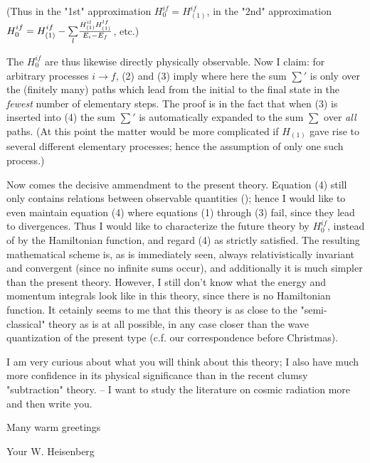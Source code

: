 (Thus in the "1st" approximation $H_0^{if}=H_{(1)}^{if}$, in the "2nd" approximation $H_0^{if} = H_{(1)}^{if} - \underset{l}{\sum}\frac{H_{(1)}^{il} H_{(1)}^{lf}}{E_i - E_f}$, etc.)

The $H_0^{if}$ are thus likewise directly physically observable. Now I claim: for arbitrary processes $i\to f$, (2) and (3) imply
where here the sum $\sum'$ is only over the (finitely many) paths which lead from the initial to the final state in the \textit{fewest} number of elementary steps. The proof is in the fact that when (3) is inserted into (4) the sum $\sum'$ is automatically expanded to the sum $\sum$ over \textit{all} paths. (At this point the matter would be more complicated if $H_{(1)}$ gave rise to several different elementary processes; hence the assumption of only one such process.)

Now comes the decisive ammendment to the present theory. Equation (4) still only contains relations between observable quantities (); hence I would like to even maintain equation (4) where equations (1) through (3) fail, since they lead to divergences. Thus I would like to characterize the future theory by $H_0^{if}$, instead of by the Hamiltonian function, and regard (4) as strictly satisfied. The resulting mathematical scheme is, as is immediately seen, always relativistically invariant and convergent (since no infinite sums occur), and additionally it is much simpler than the present theory. However, I still don't know what the energy and momentum integrals look like in this theory, since there is no Hamiltonian function. It cetainly seems to me that this theory is as close to the "semi-classical" theory as is at all possible, in any case closer than the wave quantization of the present type (c.f. our correspondence before Christmas).

I am very curious about what you will think about this theory; I also have much more confidence in its physical significance than in the recent clumsy "subtraction" theory. -- I want to study the literature on cosmic radiation more and then write you.

Many warm greetings

Your W. Heisenberg

